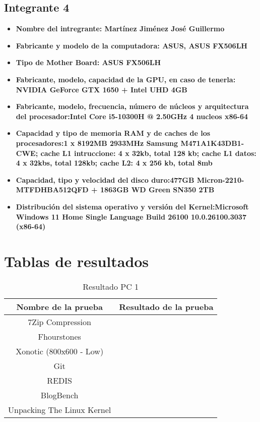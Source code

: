 \documentclass[12pt]{article}
\newcommand{\pl}[1]{\item \textbf{ #1 }}
\begin{document}
\subsection{Integrante 4}
\begin{itemize}
    \pl{Nombre del intregrante: Martínez Jiménez José Guillermo}

    \pl{Fabricante y modelo de la computadora: ASUS, ASUS FX506LH}

    \pl{Tipo de Mother Board: ASUS FX506LH}

    \pl{Fabricante, modelo, capacidad de la GPU, en caso de tenerla: NVIDIA GeForce GTX 1650 + Intel UHD 4GB}

    \pl{Fabricante, modelo, frecuencia, número de núcleos y arquitectura del procesador:Intel Core i5-10300H @ 2.50GHz 4 nucleos x86-64}

    \pl{Capacidad y tipo de memoria RAM y de caches de los procesadores:1 x 8192MB 2933MHz Samsung M471A1K43DB1-CWE; cache L1 intruccione: 4 x 32kb, total 128 kb; cache L1 datos: 4 x 32kbs, total 128kb; cache L2: 4 x 256 kb, total 8mb}

    \pl{Capacidad, tipo y velocidad del disco duro:477GB Micron-2210-MTFDHBA512QFD + 1863GB WD Green SN350 2TB}

    \pl{Distribución del sistema operativo y versión del Kernel:Microsoft Windows 11 Home Single Language Build 26100 10.0.26100.3037 (x86-64)}
\end{itemize}

\newpage
\section{Tablas de resultados}

\begin{table}[!htb]
    \centering
    \begin{tabular}{|c|c|}
        \hline
        \textbf{Nombre de la prueba} & \textbf{Resultado de la prueba}\\
        \hline
        7Zip Compression &  \\
        \hline
        Fhourstones &  \\
        \hline
        Xonotic (800x600 - Low) &  \\
        \hline
        Git &  \\
        \hline
        REDIS &  \\
        \hline
        BlogBench &  \\
        \hline
        Unpacking The Linux Kernel &  \\
        \hline
    \end{tabular}
    \caption{Resultado PC 1}
\end{table}
\end{document}
